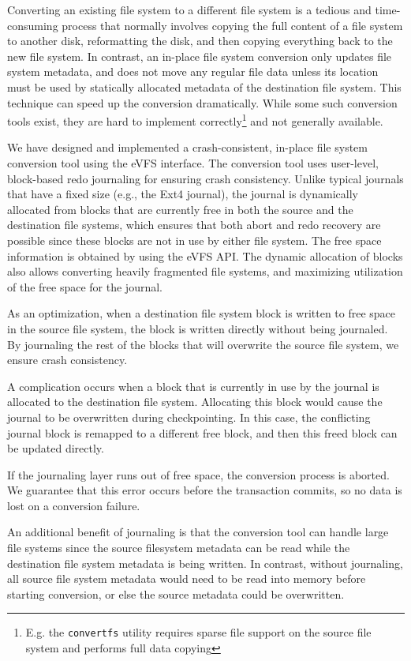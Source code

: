 Converting an existing file system to a different file system is a tedious and time-consuming process that normally involves copying the full content of a file system to another disk, reformatting the disk, and then copying everything back to the new file system. In contrast, an in-place file system conversion only updates file system metadata, and does not move any regular file data unless its location must be used by statically allocated metadata of the destination file system. This technique can speed up the conversion dramatically. While some such conversion tools exist, they are hard to implement correctly\footnote{E.g. the \texttt{convertfs} utility \cite{convertfs} requires sparse file support on the source file system and performs full data copying} and not generally available.

We have designed and implemented a crash-consistent, in-place file system conversion tool using the eVFS interface. The conversion tool uses user-level, block-based redo journaling for ensuring crash consistency. Unlike typical journals that have a fixed size (e.g., the Ext4 journal), the journal is dynamically allocated from blocks that are currently free in both the source and the destination file systems, which ensures that both abort and redo recovery are possible since these blocks are not in use by either file system. The free space information is obtained by using the eVFS API. The dynamic allocation of blocks also allows converting heavily fragmented file systems, and maximizing utilization of the free space for the journal.

As an optimization, when a destination file system block is written to free space in the source file system, the block is written directly without being journaled. By journaling the rest of the blocks that will overwrite the source file system, we ensure crash consistency.

A complication occurs when a block that is currently in use by the journal is allocated to the destination file system. Allocating this block would cause the journal to be overwritten during checkpointing. In this case, the conflicting journal block is remapped to a different free block, and then this freed block can be updated directly.

If the journaling layer runs out of free space, the conversion process is aborted. We guarantee that this error occurs before the transaction commits, so no data is lost on a conversion failure.

An additional benefit of journaling is that the conversion tool can handle large file systems since the source filesystem metadata can be read while the destination file system metadata is being written. In contrast, without journaling, all source file system metadata would need to be read into memory before starting conversion, or else the source metadata could be overwritten.

